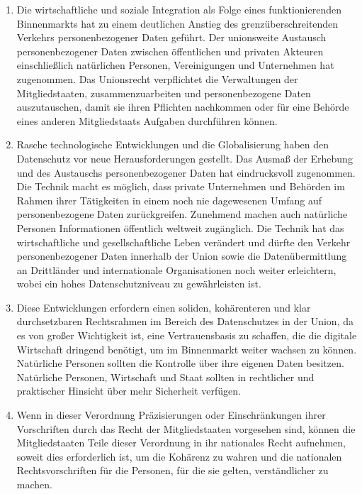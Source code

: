 \begin{enumerate}

   \item Die wirtschaftliche und soziale Integration als Folge eines funktionierenden Binnenmarkts hat zu einem
    deutlichen Anstieg des grenzüberschreitenden Verkehrs personenbezogener Daten geführt. Der unionsweite Austausch
    personenbezogener Daten zwischen öffentlichen und privaten Akteuren einschließlich natürlichen Personen,
    Vereinigungen und Unternehmen hat zugenommen. Das Unionsrecht verpflichtet die Verwaltungen der Mitgliedstaaten,
    zusammenzuarbeiten und personenbezogene Daten auszutauschen, damit sie ihren Pflichten nachkommen oder für eine
    Behörde eines anderen Mitgliedstaats Aufgaben durchführen können.%
   \label{eg:5}
   

   \item Rasche technologische Entwicklungen und die Globalisierung haben den Datenschutz vor neue Herausforderungen
    gestellt. Das Ausmaß der Erhebung und des Austauschs personenbezogener Daten hat eindrucksvoll zugenommen. Die
    Technik macht es möglich, dass private Unternehmen und Behörden im Rahmen ihrer Tätigkeiten in einem noch nie
    dagewesenen Umfang auf personenbezogene Daten zurückgreifen. Zunehmend machen auch natürliche Personen
    Informationen öffentlich weltweit zugänglich. Die Technik hat das wirtschaftliche und gesellschaftliche Leben
    verändert und dürfte den Verkehr personenbezogener Daten innerhalb der Union sowie die Datenübermittlung an
    Drittländer und internationale Organisationen noch weiter erleichtern, wobei ein hohes Datenschutzniveau zu
    gewährleisten ist.%
   \label{eg:6}
   

   \item Diese Entwicklungen erfordern einen soliden, kohärenteren und klar durchsetzbaren Rechtsrahmen im Bereich des
    Datenschutzes in der Union, da es von großer Wichtigkeit ist, eine Vertrauensbasis zu schaffen, die die digitale
    Wirtschaft dringend benötigt, um im Binnenmarkt weiter wachsen zu können. Natürliche Personen sollten die Kontrolle
    über ihre eigenen Daten besitzen. Natürliche Personen, Wirtschaft und Staat sollten in rechtlicher und praktischer
    Hinsicht über mehr Sicherheit verfügen.%
   \label{eg:7}
   

   \item Wenn in dieser Verordnung Präzisierungen oder Einschränkungen ihrer Vorschriften durch das Recht der
    Mitgliedstaaten vorgesehen sind, können die Mitgliedstaaten Teile dieser Verordnung in ihr nationales Recht
    aufnehmen, soweit dies erforderlich ist, um die Kohärenz zu wahren und die nationalen Rechtsvorschriften für die
    Personen, für die sie gelten, verständlicher zu machen.%
   \label{eg:8}
   

\end{enumerate}
